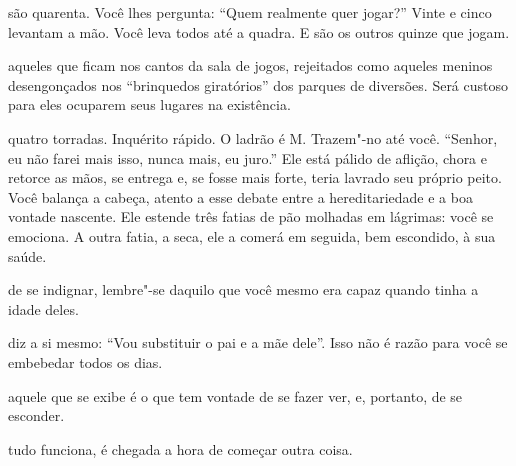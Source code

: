  são quarenta. Você lhes pergunta: ``Quem realmente quer jogar?''
Vinte e cinco levantam a mão.
Você leva todos até a quadra. E são os
outros quinze que jogam.



 aqueles que ficam nos cantos da sala de jogos, rejeitados como
aqueles meninos desengonçados nos ``brinquedos giratórios'' dos parques
de diversões. Será custoso para eles ocuparem seus lugares na
existência.

\pagebreak


 quatro torradas. Inquérito rápido. O ladrão é M. Trazem"-no até
você. ``Senhor, eu não farei mais isso, nunca mais, eu juro.'' Ele está
pálido de aflição, chora e retorce as mãos, se entrega e, se fosse mais
forte, teria lavrado seu próprio peito. Você balança a cabeça, atento a
esse debate entre a hereditariedade e a boa vontade nascente. Ele
estende três fatias de pão molhadas em lágrimas: você se emociona. A
outra fatia, a seca, ele a comerá em seguida, bem escondido, à sua
saúde.



 de se indignar, lembre"-se daquilo que você mesmo era capaz quando
tinha a idade deles.



 diz a si mesmo: ``Vou substituir o pai e a mãe dele''. Isso não é
razão para você se embebedar todos os dias.



 aquele que se exibe é o que tem vontade de se fazer ver, e,
portanto, de se esconder.



 tudo funciona, é chegada a hora de começar outra coisa.

\pagebreak
\thispagestyle{empty}

